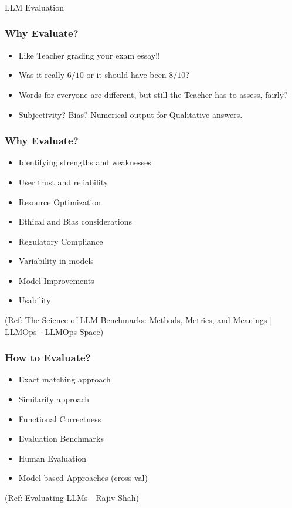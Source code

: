 \begin{frame}[fragile]\frametitle{}
\begin{center}
{\Large LLM Evaluation}
\end{center}
\end{frame}

\begin{frame}[fragile]\frametitle{Why Evaluate?}
  \begin{itemize}
  \item Like Teacher grading your exam essay!!
  \item Was it really $6/10$ or it should have been $8/10$?
  \item Words for everyone are different, but still the Teacher has to assess, fairly?
  \item Subjectivity? Bias? Numerical output for Qualitative answers.
  \end{itemize}
\end{frame}

\begin{frame}[fragile]\frametitle{Why Evaluate?}
  \begin{itemize}
    \item Identifying strengths and weaknesses
	\item User trust and reliability
	\item Resource Optimization
	\item Ethical and Bias considerations
	\item Regulatory Compliance
	\item Variability in models
	\item Model Improvements
	\item Usability
  \end{itemize}
  
  {\tiny (Ref: The Science of LLM Benchmarks: Methods, Metrics, and Meanings | LLMOps - LLMOps Space)}
  
\end{frame}



\begin{frame}[fragile]\frametitle{How to Evaluate?}
  \begin{itemize}
    \item Exact matching approach
    \item Similarity approach
    \item Functional Correctness
    \item Evaluation Benchmarks
    \item Human Evaluation
    \item Model based Approaches (cross val)
  \end{itemize}
  
  {\tiny (Ref: Evaluating LLMs - Rajiv Shah)}
  
\end{frame}

